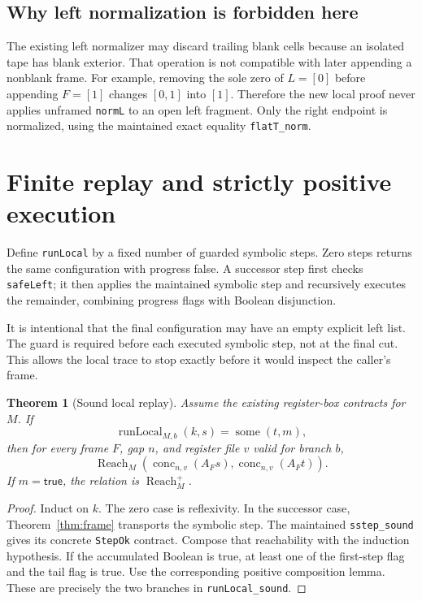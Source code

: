 \documentclass[11pt]{article}
\newtheorem{theorem}{Theorem}[section]
\theoremstyle{definition}\newtheorem{definition}[theorem]{Definition}
\theoremstyle{remark}\newtheorem{remark}[theorem]{Remark}
\newcommand{\Reach}{\operatorname{Reach}}
\newcommand{\Reachp}{\operatorname{Reach}^{+}}
\newcommand{\Conc}{\operatorname{conc}}
\newcommand{\code}[1]{\nolinkurl{#1}}
\begin{document}
\subsection{Why left normalization is forbidden here}

The existing left normalizer may discard trailing blank cells because an isolated tape has blank exterior. That operation is not compatible with later appending a nonblank frame. For example, removing the sole zero of $L=[0]$ before appending $F=[1]$ changes $[0,1]$ into $[1]$. Therefore the new local proof never applies unframed \code{normL} to an open left fragment. Only the right endpoint is normalized, using the maintained exact equality \code{flatT_norm}.

\section{Finite replay and strictly positive execution}

Define \code{runLocal} by a fixed number of guarded symbolic steps. Zero steps returns the same configuration with progress false. A successor step first checks \code{safeLeft}; it then applies the maintained symbolic step and recursively executes the remainder, combining progress flags with Boolean disjunction.

It is intentional that the final configuration may have an empty explicit left list. The guard is required before each executed symbolic step, not at the final cut. This allows the local trace to stop exactly before it would inspect the caller's frame.

\begin{theorem}[Sound local replay]
Assume the existing register-box contracts for $M$. If
\[
 \operatorname{runLocal}_{M,b}(k,s)=\operatorname{some}(t,m),
\]
then for every frame $F$, gap $n$, and register file $v$ valid for branch $b$,
\[
 \Reach_M(\Conc_{n,v}(A_Fs),\Conc_{n,v}(A_Ft)).
\]
If $m=\mathsf{true}$, the relation is $\Reachp_M$.
\end{theorem}
\begin{proof}
Induct on $k$. The zero case is reflexivity. In the successor case, Theorem~\ref{thm:frame} transports the symbolic step. The maintained \code{sstep_sound} gives its concrete \code{StepOk} contract. Compose that reachability with the induction hypothesis. If the accumulated Boolean is true, at least one of the first-step flag and the tail flag is true. Use the corresponding positive composition lemma. These are precisely the two branches in \code{runLocal_sound}.
\end{proof}
\end{document}
